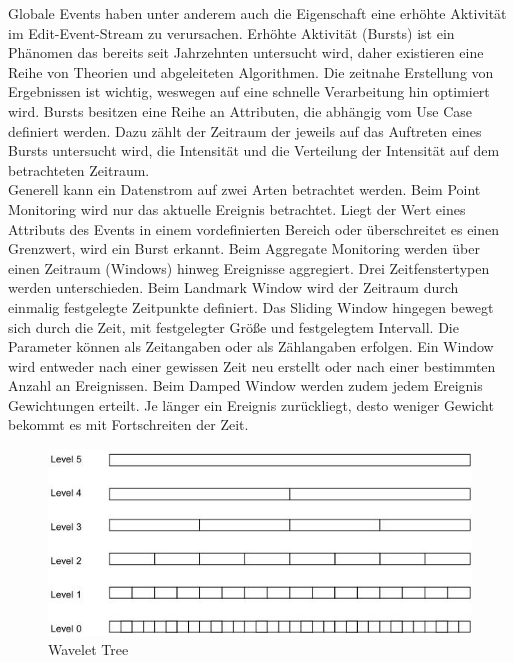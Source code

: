 Globale Events haben unter anderem auch die Eigenschaft eine erhöhte Aktivität im Edit-Event-Stream zu verursachen. Erhöhte Aktivität (Bursts) ist ein Phänomen das bereits seit Jahrzehnten untersucht wird, daher existieren eine Reihe von Theorien und abgeleiteten Algorithmen. Die zeitnahe Erstellung von Ergebnissen ist wichtig, weswegen auf eine schnelle Verarbeitung hin optimiert wird. Bursts besitzen eine Reihe an Attributen, die abhängig vom Use Case definiert werden. Dazu zählt der Zeitraum der jeweils auf das Auftreten eines Bursts untersucht wird, die Intensität und die Verteilung der Intensität auf dem betrachteten Zeitraum.\\

Generell kann ein Datenstrom auf zwei Arten betrachtet werden. Beim Point Monitoring wird nur das aktuelle Ereignis betrachtet. Liegt der Wert eines Attributs des Events in einem vordefinierten Bereich oder überschreitet es einen Grenzwert, wird ein Burst erkannt. Beim Aggregate Monitoring werden über einen Zeitraum (Windows) hinweg Ereignisse aggregiert. Drei Zeitfenstertypen werden unterschieden. Beim Landmark Window wird der Zeitraum durch einmalig festgelegte Zeitpunkte definiert.
Das Sliding Window hingegen bewegt sich durch die Zeit, mit festgelegter Größe und festgelegtem Intervall. Die Parameter können als Zeitangaben oder als Zählangaben erfolgen. Ein Window wird entweder nach einer gewissen Zeit neu erstellt oder nach einer bestimmten Anzahl an Ereignissen. Beim Damped Window werden zudem jedem Ereignis Gewichtungen erteilt. Je länger ein Ereignis zurückliegt, desto weniger Gewicht bekommt es mit Fortschreiten der Zeit. \cite{Zhu:2003:EEB:956750.956789}\\

\begin{figure}[h]
    \includegraphics[width=.5\textwidth]{images/wavelet.jpg}
    \caption{Wavelet Tree \cite{Zhu:2003:EEB:956750.956789}}
    \label{fig:wavelet}
\end{figure}

